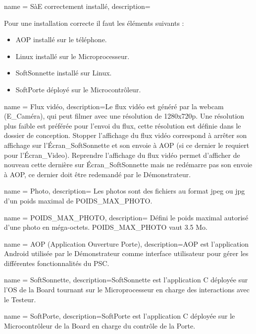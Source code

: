 {
    name = {SàE correctement installé},
    description={\hypertarget{install}{}Pour une installation correcte il faut les éléments suivants :
    \begin{itemize}
        \item AOP installé sur le téléphone.
        \item Linux installé sur le Microprocesseur. 
        \item SoftSonnette installé sur Linux.
        \item SoftPorte déployé sur le Microcontrôleur.
    \end{itemize}
    }
}

{
    name = {Flux vidéo},
    description={\hypertarget{video}{}Le flux vidéo est généré par la webcam (E\_Caméra), qui peut filmer avec une résolution de 1280x720p.
    Une résolution plus faible est préférée pour l'envoi du flux, cette résolution est définie dans le dossier de conception.  
    Stopper l'affichage du flux vidéo correspond à arrêter son affichage sur l'Écran\_SoftSonnette et son envoie à AOP (si ce dernier le requiert pour l'Écran\_Video).
    Reprendre l'affichage du flux vidéo permet d'afficher de nouveau cette dernière sur Écran\_SoftSonnette mais ne redémarre pas son envoie à AOP, ce dernier doit être redemandé par le Démonstrateur.
    }
}

{
    name = {Photo},
    description={\hypertarget{photo}{}%
    Les photos sont des fichiers au format jpeg ou jpg d'un poids maximal de POIDS\_MAX\_PHOTO.
    }
}

{
    name = {POIDS\_MAX\_PHOTO},
    description={\hypertarget{poidsPhoto}{} Défini le poids maximal autorisé d'une photo en méga-octets.
    POIDS\_MAX\_PHOTO vaut 3.5 Mo.
    }
}

{
    name = {AOP (Application Ouverture Porte)},
    description={\hypertarget{Aop}{}AOP est l'application Android utilisée par le Démonstrateur comme interface utilisateur pour gérer les différentes fonctionnalités du PSC.
    }
}

{
    name = {SoftSonnette},
    description={\hypertarget{SoftSonnette}{}SoftSonnette est l'application C déployée sur l'OS de la Board tournant sur le Microprocesseur en charge des interactions avec le Testeur.
    }
}

{
    name = {SoftPorte},
    description={\hypertarget{SoftPorte}{}SoftPorte est l'application C déployée sur le Microcontrôleur de la Board en charge du contrôle de la Porte.
    }
}

